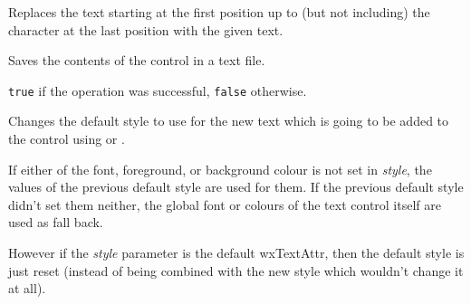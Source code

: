 

\label{wxtextctrlreplace}


Replaces the text starting at the first position up to (but not including)
the character at the last position with the given text.






\label{wxtextctrlsavefile}


Saves the contents of the control in a text file.




{\tt true} if the operation was successful, {\tt false} otherwise.


\label{wxtextctrlsetdefaultstyle}


Changes the default style to use for the new text which is going to be added
to the control using  or\rtfsp
{}.

If either of the font, foreground, or background colour is not set in\rtfsp
{\it style}, the values of the previous default style are used for them. If
the previous default style didn't set them neither, the global font or colours
of the text control itself are used as fall back.

However if the {\it style} parameter is the default wxTextAttr, then the
default style is just reset (instead of being combined with the new style which
wouldn't change it at all).



